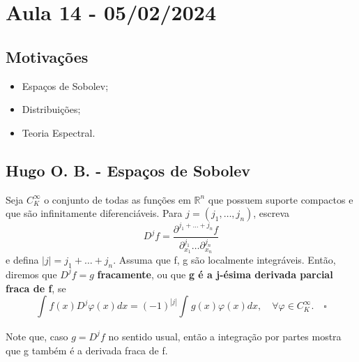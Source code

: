 \documentclass[measure_theory.tex]{subfiles}
\begin{document}
\section{Aula 14 - 05/02/2024}
\subsection{Motivações}
\begin{itemize}
	\item Espaços de Sobolev;
	\item Distribuições;
	\item Teoria Espectral.
\end{itemize}
\subsection{Hugo O. B. - Espaços de Sobolev}
\begin{def*}
	Seja \(C_{K}^{\infty}\) o conjunto de todas as funções em \(\mathbb{R}^{n}\) que possuem suporte compactos e que são infinitamente diferenciáveis. Para \(j=(j_{1},\dotsc ,j_{n})\), escreva
	\[
		D^{j}f=\frac{\partial^{j_{1}+\dotsc +j_{n}}f}{\partial ^{j_{1}}_{x_{1}}\dotsc \partial ^{j_{n}}_{x_{n}}}
	\]
	e defina \(|j|=j_{1}+\dotsc +j_{n}.\) Assuma que f, g são localmente integráveis. Então, diremos que \(D^{j}f=g\) \textbf{fracamente}, ou que \textbf{g é a j-ésima derivada parcial fraca de f}, se
	\[
		\int_{}^{}f(x)D^{j}\varphi (x)dx=(-1)^{|j|}\int_{}^{}g(x)\varphi (x)dx,\quad \forall \varphi\in C_{K}^{\infty}.\quad \square
	\]
\end{def*}

Note que, caso \(g=D^{j}f\) no sentido usual, então a integração por partes mostra que g também é a derivada fraca de f.
\end{document}
